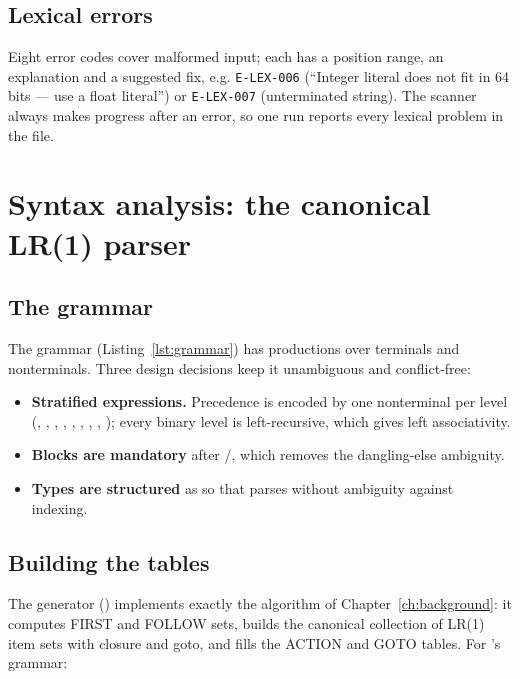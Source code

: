 \begin{table}[H]\centering\small

\caption{Real token stream for \texttt{fn main() \{ print(1 + 2 * 3); \}}.}\label{tab:tokens}
\end{table}

\subsection{Lexical errors}
Eight error codes cover malformed input; each has a position range, an explanation and a suggested fix, e.g. \texttt{E-LEX-006} (``Integer literal does not fit in 64 bits --- use a float literal'') or \texttt{E-LEX-007} (unterminated string). The scanner always makes progress after an error, so one run reports every lexical problem in the file.

\section{Syntax analysis: the canonical LR(1) parser}
\subsection{The grammar}
The grammar (Listing~\ref{lst:grammar}) has \LRProductions{} productions over \LRTerminals{} terminals and \LRNonterminals{} nonterminals. Three design decisions keep it unambiguous and conflict-free:

\begin{itemize}
  \item \textbf{Stratified expressions.} Precedence is encoded by one nonterminal per level (, , , , , , , , ); every binary level is left-recursive, which gives left associativity.
  \item \textbf{Blocks are mandatory} after /, which removes the dangling-else ambiguity.
  \item \textbf{Types are structured} as  so that  parses without ambiguity against indexing.
\end{itemize}

\subsection{Building the tables}
The generator () implements exactly the algorithm of Chapter~\ref{ch:background}: it computes FIRST and FOLLOW sets, builds the canonical collection of LR(1) item sets with closure and goto, and fills the ACTION and GOTO tables. For \nova{}'s grammar:

